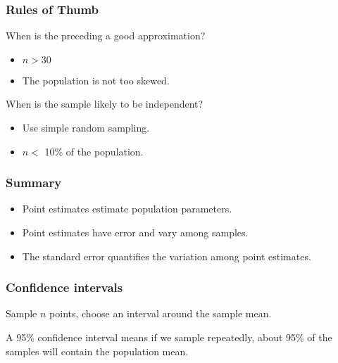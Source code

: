 \documentclass[t]{beamer}
\newcommand\cimg[1]{\centerline{\texttt{[image: \#1]}}}
\begin{document}
\begin{frame}
  \frametitle{Rules of Thumb}

  When is the preceding a good approximation?

  \begin{itemize}
  \item $n>30$
  \item The population is not too skewed.
  \end{itemize}

  When is the sample likely to be independent?

  \begin{itemize}
  \item Use simple random sampling.
  \item $n < $ 10\% of the population.
  \end{itemize}

  \note{

  }
\end{frame}

\begin{frame}
  \frametitle{Summary}

  \begin{itemize}
  \item Point estimates estimate population parameters.
  \item Point estimates have error and vary among samples.
  \item The standard error quantifies the variation among point estimates.
  \end{itemize}

  \note{

  }
\end{frame}

\begin{frame}
  \frametitle{Confidence intervals}

  Sample $n$ points, choose an interval around the sample mean.

  A 95\% confidence interval means if we sample repeatedly, about 95\%
  of the samples will contain the population mean.


  \only<3>{
    \cimg{confidence-intervals.png}
  }


\end{frame}

\begin{frame}
  \frametitle{}

  \note{

  }

\end{frame}
\end{document}
